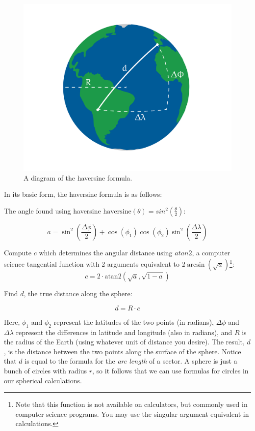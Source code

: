 \begin{figure}[htbp]
    \centering
    \includegraphics[width=\textwidth]{haversine.png}
    \caption{A diagram of the haversine formula.}
    \label{fig:haversine}
\end{figure}


In its basic form, the haversine formula is as follows:

The angle found using haversine $\text{haversine}(\theta) = sin^2\left(\frac{\theta}{2}\right)$:

\[
a = \sin^2\left(\frac{\Delta\phi}{2}\right) + \cos(\phi_1)\cos(\phi_2)\sin^2\left(\frac{\Delta\lambda}{2}\right)
\]

Compute $c$ which determines the angular distance using $atan2$, a computer science tangential function with 2 arguments equivalent to $2 \arcsin(\sqrt{a})$\footnote{Note that this function is not available on calculators, but commonly used in computer science programs. You may use the singular argument equivalent in calculations.}:
\[
c = 2 \cdot \text{atan2} \left( \sqrt{a}, \sqrt{1-a} \right)
\]


Find $d$, the true distance along the sphere:

\[
d = R \cdot c
\]

Here, $\phi_1$ and $\phi_2$ represent the latitudes of the two points (in radians),
$\Delta\phi$ and $\Delta\lambda$ represent the differences in latitude
and longitude (also in radians), and $R$ is the radius of the
Earth (using whatever unit of distance you desire). The result, $d$, is the distance between the two points along
the surface of the sphere. Notice that $d$ is equal to the formula for the \emph{arc length} of a sector. 
A sphere is just a bunch of circles with radius $r$, so it follows that we can use formulas for circles in our spherical calculations. 

